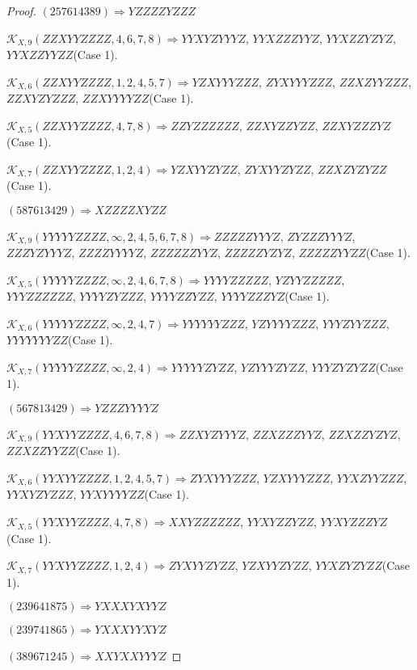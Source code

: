 \documentclass[12pt]{article}
\theoremstyle{plain}
\theoremstyle{definition}
\theoremstyle{remark}
\newcommand{\fancy}[1]{\mathcal{#1}}
\def\K{\fancy{K}}
\begin{document}
\begin{proof}
	
	
	$(2 5 7 6 1 4 3 8 9)\Rightarrow YZZZZYZZZ$
	
	
	
	$\K_{X,9}(ZZXYYZZZZ,4, 6, 7, 8)\Rightarrow $$YYXYZYYYZ$, $YYXZZZYYZ$, $YYXZZYZYZ$, $YYXZZYYZZ$(Case 1).
	
	$\K_{X,6}(ZZXYYZZZZ,1, 2, 4, 5, 7)\Rightarrow $$YZXYYYZZZ$, $ZYXYYYZZZ$, $ZZXZYYZZZ$, $ZZXYZYZZZ$, $ZZXYYYYZZ$(Case 1).
	
	$\K_{X,5}(ZZXYYZZZZ,4, 7, 8)\Rightarrow $$ZZYZZZZZZ$, $ZZXYZZYZZ$, $ZZXYZZZYZ$(Case 1).
	
	$\K_{X,7}(ZZXYYZZZZ,1, 2, 4)\Rightarrow $$YZXYYZYZZ$, $ZYXYYZYZZ$, $ZZXZYZYZZ$(Case 1).
	
	
	
	$(5 8 7 6 1 3 4 2 9)\Rightarrow XZZZZXYZZ$
	
	
	
	$\K_{X,9}(YYYYYZZZZ,\infty,2, 4, 5, 6, 7, 8)\Rightarrow $$ZZZZZYYYZ$, $ZYZZZYYYZ$, $ZZZYZYYYZ$, $ZZZZYYYYZ$, $ZZZZZZYYZ$, $ZZZZZYZYZ$, $ZZZZZYYZZ$(Case 1).
	
	$\K_{X,5}(YYYYYZZZZ,\infty,2, 4, 6, 7, 8)\Rightarrow $$YYYYZZZZZ$, $YZYYZZZZZ$, $YYYZZZZZZ$, $YYYYZYZZZ$, $YYYYZZYZZ$, $YYYYZZZYZ$(Case 1).
	
	$\K_{X,6}(YYYYYZZZZ,\infty,2, 4, 7)\Rightarrow $$YYYYYYZZZ$, $YZYYYYZZZ$, $YYYZYYZZZ$, $YYYYYYYZZ$(Case 1).
	
	$\K_{X,7}(YYYYYZZZZ,\infty,2, 4)\Rightarrow $$YYYYYZYZZ$, $YZYYYZYZZ$, $YYYZYZYZZ$(Case 1).
	
	
	
	$(5 6 7 8 1 3 4 2 9)\Rightarrow YZZZYYYYZ$
	
	
	
	$\K_{X,9}(YYXYYZZZZ,4, 6, 7, 8)\Rightarrow $$ZZXYZYYYZ$, $ZZXZZZYYZ$, $ZZXZZYZYZ$, $ZZXZZYYZZ$(Case 1).
	
	$\K_{X,6}(YYXYYZZZZ,1, 2, 4, 5, 7)\Rightarrow $$ZYXYYYZZZ$, $YZXYYYZZZ$, $YYXZYYZZZ$, $YYXYZYZZZ$, $YYXYYYYZZ$(Case 1).
	
	$\K_{X,5}(YYXYYZZZZ,4, 7, 8)\Rightarrow $$XXYZZZZZZ$, $YYXYZZYZZ$, $YYXYZZZYZ$(Case 1).
	
	$\K_{X,7}(YYXYYZZZZ,1, 2, 4)\Rightarrow $$ZYXYYZYZZ$, $YZXYYZYZZ$, $YYXZYZYZZ$(Case 1).
	
	
	
	$(2 3 9 6 4 1 8 7 5)\Rightarrow YXXXYXYYZ$
	
	$(2 3 9 7 4 1 8 6 5)\Rightarrow YXXXYYXYZ$
	
	$(3 8 9 6 7 1 2 4 5)\Rightarrow XXYXXYYYZ$
	

\end{proof}
\end{document}
